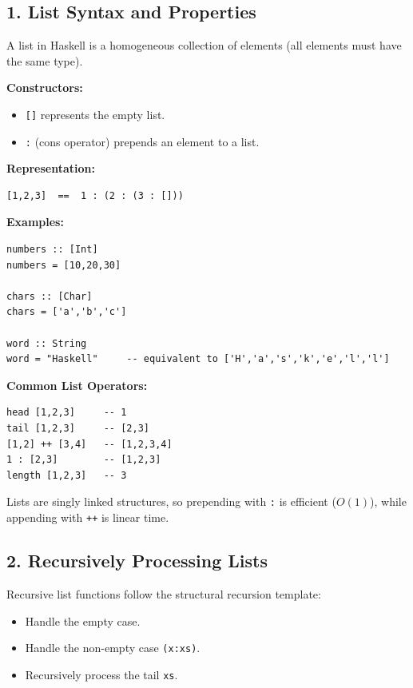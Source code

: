 \documentclass[12pt]{article}
\begin{document}
\subsection{1. List Syntax and Properties}

A list in Haskell is a homogeneous collection of elements (all elements must have the same type).

\textbf{Constructors:}
\begin{itemize}
  \item \texttt{[]} represents the empty list.
  \item \texttt{:} (cons operator) prepends an element to a list.
\end{itemize}

\textbf{Representation:}
\begin{verbatim}
[1,2,3]  ==  1 : (2 : (3 : []))
\end{verbatim}

\textbf{Examples:}
\begin{verbatim}
numbers :: [Int]
numbers = [10,20,30]

chars :: [Char]
chars = ['a','b','c']

word :: String
word = "Haskell"     -- equivalent to ['H','a','s','k','e','l','l']
\end{verbatim}

\textbf{Common List Operators:}
\begin{verbatim}
head [1,2,3]     -- 1
tail [1,2,3]     -- [2,3]
[1,2] ++ [3,4]   -- [1,2,3,4]
1 : [2,3]        -- [1,2,3]
length [1,2,3]   -- 3
\end{verbatim}

Lists are singly linked structures, so prepending with \texttt{:} is efficient ($O(1)$), while appending with \texttt{++} is linear time.

\subsection{2. Recursively Processing Lists}

Recursive list functions follow the structural recursion template:

\begin{itemize}
  \item Handle the empty case.
  \item Handle the non-empty case \texttt{(x:xs)}.
  \item Recursively process the tail \texttt{xs}.
\end{itemize}
\end{document}
